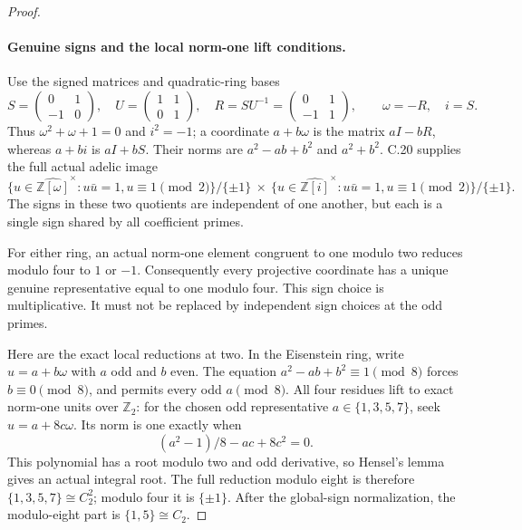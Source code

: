 \begin{proof}
\paragraph{Genuine signs and the local norm-one lift conditions.}
Use the signed matrices and quadratic-ring bases
\[
 S=\begin{pmatrix}0&1\\-1&0\end{pmatrix},\quad
 U=\begin{pmatrix}1&1\\0&1\end{pmatrix},\quad
 R=SU^{-1}=\begin{pmatrix}0&1\\-1&1\end{pmatrix},\qquad
 \omega=-R,\quad i=S.                                  \tag{C.49.3}
\]
Thus $\omega^2+\omega+1=0$ and $i^2=-1$; a coordinate
$a+b\omega$ is the matrix $aI-bR$, whereas $a+bi$ is $aI+bS$.
Their norms are $a^2-ab+b^2$ and $a^2+b^2$.
C.20 supplies the full actual adelic image
\[
 \{u\in\widehat{\mathbb Z[\omega]}^{\times}:u\bar u=1,
                      u\equiv1\pmod2\}/\{\pm1\}
 \ \times\
 \{u\in\widehat{\mathbb Z[i]}^{\times}:u\bar u=1,
                      u\equiv1\pmod2\}/\{\pm1\}.       \tag{C.49.4}
\]
The signs in these two quotients are independent of one another,
but each is a single sign shared by all coefficient primes.

For either ring, an actual norm-one element congruent to one
modulo two reduces modulo four to $1$ or $-1$.
Consequently every projective coordinate has a unique genuine
representative equal to one modulo four. This sign choice is
multiplicative. It must not be replaced by independent sign choices
at the odd primes.

Here are the exact local reductions at two. In the Eisenstein ring,
write $u=a+b\omega$ with $a$ odd and $b$ even.
The equation $a^2-ab+b^2\equiv1\pmod8$ forces $b\equiv0\pmod8$,
and permits every odd $a\pmod8$. All four residues lift to exact
norm-one units over $\mathbb Z_2$: for the chosen odd representative
$a\in\{1,3,5,7\}$, seek $u=a+8c\omega$. Its norm is one exactly when
\[
                  (a^2-1)/8-ac+8c^2=0.                 \tag{C.49.5}
\]
This polynomial has a root modulo two and odd derivative, so Hensel's
lemma gives an actual integral root. The full reduction modulo eight
is therefore $\{1,3,5,7\}\cong C_2^2$; modulo four it is
$\{\pm1\}$. After the global-sign normalization, the modulo-eight
part is $\{1,5\}\cong C_2$.


\end{proof}
